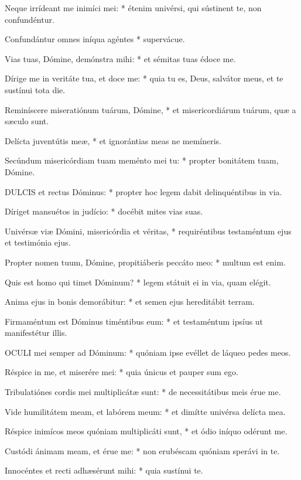 Neque irrídeant me inimíci mei: * étenim univérsi, qui sústinent te, non confundéntur.

Confundántur omnes iníqua agéntes * supervácue.

Vias tuas, Dómine, demónstra mihi: * et sémitas tuas édoce me.

Dírige me in veritáte tua, et doce me: * quia tu es, Deus, salvátor meus, et te sustínui tota die.

Reminíscere miseratiónum tuárum, Dómine, * et misericordiárum tuárum, quæ a sæculo sunt.

Delícta juventútis meæ, * et ignorántias meas ne memíneris.

Secúndum misericórdiam tuam meménto mei tu: * propter bonitátem tuam, Dómine.


\lettrine[lines=2]{D}{ULCIS} et rectus Dóminus: * propter hoc legem dabit delinquéntibus in via.

Díriget mansuétos in judício: * docébit mites vias suas.

Univérsæ viæ Dómini, misericórdia et véritas, * requiréntibus testaméntum ejus et testimónia ejus.

Propter nomen tuum, Dómine, propitiáberis peccáto meo: * multum est enim.

Quis est homo qui timet Dóminum? * legem státuit ei in via, quam elégit.

Anima ejus in bonis demorábitur: * et semen ejus hereditábit terram.

Firmaméntum est Dóminus timéntibus eum: * et testaméntum ipsíus ut manifestétur illis.


\lettrine[lines=2]{O}{CULI} mei semper ad Dóminum: * quóniam ipse evéllet de láqueo pedes meos.

Réspice in me, et miserére mei: * quia únicus et pauper sum ego.

Tribulatiónes cordis mei multiplicátæ sunt: * de necessitátibus meis érue me.

Vide humilitátem meam, et labórem meum: * et dimítte univérsa delícta mea.

Réspice inimícos meos quóniam multiplicáti sunt, * et ódio iníquo odérunt me.

Custódi ánimam meam, et érue me: * non erubéscam quóniam sperávi in te.

Innocéntes et recti adhæsérunt mihi: * quia sustínui te.


